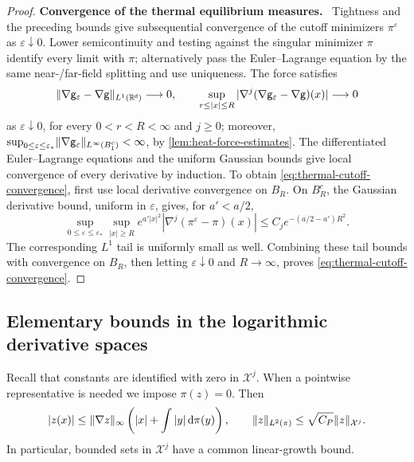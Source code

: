 \documentclass[11pt,reqno]{amsart}
\numberwithin{equation}{section}
\theoremstyle{plain}
\theoremstyle{remark}
\DeclarePairedDelimiter{\norm}{\lVert}{\rVert}
\renewcommand{\d}{\mathsf{d}}\newcommand{\s}{\mathsf{s}}
\newcommand{\parheading}[1]{\par\medskip\noindent\textbf{#1}\ }
\newcommand{\Xspace}{\mathcal X}
\begin{document}
\begin{proof}
\parheading{Convergence of the thermal equilibrium measures.}
Tightness and the preceding bounds give subsequential convergence of the cutoff minimizers $\pi^\varepsilon$ as $\varepsilon\downarrow0$. Lower semicontinuity and testing against the singular minimizer $\pi$ identify every limit with $\pi$; alternatively pass the Euler--Lagrange equation by the same near-/far-field splitting and use uniqueness. The force satisfies
\begin{equation}\label{eq:thermal-force-convergence-explicit}
 \norm{\nabla\g_\varepsilon-\nabla\g}_{L^1(\R^\d)}\longrightarrow0,
 \qquad
 \sup_{r\le|x|\le R}|\nabla^j(\nabla\g_\varepsilon-\nabla\g)(x)|\longrightarrow0
\end{equation}
as $\varepsilon\downarrow0$, for every $0<r<R<\infty$ and $j\ge0$; moreover, $\sup_{0\le\varepsilon\le\varepsilon_*}\norm{\nabla\g_\varepsilon}_{L^\infty(B_1^c)}<\infty$, by \cref{lem:heat-force-estimates}. The differentiated Euler--Lagrange equations and the uniform Gaussian bounds give local convergence of every derivative by induction. To obtain \eqref{eq:thermal-cutoff-convergence}, first use local derivative convergence on $B_R$. On $B_R^c$, the Gaussian derivative bound, uniform in $\varepsilon$, gives, for $a'<a/2$,
\begin{equation}\label{eq:thermal-tail-convergence}
 \sup_{0\le\varepsilon\le\varepsilon_*}\sup_{|x|\ge R}
 e^{a'|x|^2}|\nabla^j(\pi^\varepsilon-\pi)(x)|
 \le C_j e^{-(a/2-a')R^2}.
\end{equation}
The corresponding $L^1$ tail is uniformly small as well. Combining these tail bounds with convergence on $B_R$, then letting $\varepsilon\downarrow0$ and $R\to\infty$, proves \eqref{eq:thermal-cutoff-convergence}.

\end{proof}

\subsection{Elementary bounds in the logarithmic derivative spaces}\label{app:logarithmic-maps}
Recall that constants are identified with zero in $\Xspace^j$. When a pointwise representative is needed we impose $\pi(z)=0$. Then
\begin{equation}\label{eq:linear-growth-representative}
 |z(x)|\le\norm{\nabla z}_\infty\left(|x|+\int|y|\dd\pi(y)\right),\qquad
 \norm z_{L^2(\pi)}\le\sqrt{C_P}\norm z_{\Xspace^j}.
\end{equation}
In particular, bounded sets in $\Xspace^j$ have a common linear-growth bound.
\end{document}
